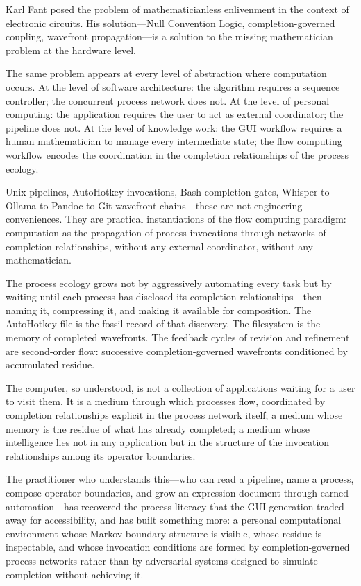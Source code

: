 \documentclass[12pt, a4paper]{article}
\begin{document}
Karl Fant posed the problem of mathematicianless enlivenment in the
context of electronic circuits. His solution---Null Convention Logic,
completion-governed coupling, wavefront propagation---is a solution
to the missing mathematician problem at the hardware level.

The same problem appears at every level of abstraction where
computation occurs. At the level of software architecture: the
algorithm requires a sequence controller; the concurrent process
network does not. At the level of personal computing: the application
requires the user to act as external coordinator; the pipeline does
not. At the level of knowledge work: the GUI workflow requires a
human mathematician to manage every intermediate state; the flow
computing workflow encodes the coordination in the completion
relationships of the process ecology.

Unix pipelines, AutoHotkey invocations, Bash completion gates,
Whisper-to-Ollama-to-Pandoc-to-Git wavefront chains---these are not
engineering conveniences. They are practical instantiations of the
flow computing paradigm: computation as the propagation of process
invocations through networks of completion relationships, without
any external coordinator, without any mathematician.

The process ecology grows not by aggressively automating every task
but by waiting until each process has disclosed its completion
relationships---then naming it, compressing it, and making it
available for composition. The AutoHotkey file is the fossil record
of that discovery. The filesystem is the memory of completed
wavefronts. The feedback cycles of revision and refinement are
second-order flow: successive completion-governed wavefronts
conditioned by accumulated residue.

The computer, so understood, is not a collection of applications
waiting for a user to visit them. It is a medium through which
processes flow, coordinated by completion relationships explicit
in the process network itself; a medium whose memory is the
residue of what has already completed; a medium whose intelligence
lies not in any application but in the structure of the invocation
relationships among its operator boundaries.

The practitioner who understands this---who can read a pipeline,
name a process, compose operator boundaries, and grow an expression
document through earned automation---has recovered the process
literacy that the GUI generation traded away for accessibility,
and has built something more: a personal computational environment
whose Markov boundary structure is visible, whose residue is
inspectable, and whose invocation conditions are formed by
completion-governed process networks rather than by adversarial
systems designed to simulate completion without achieving it.
\end{document}
